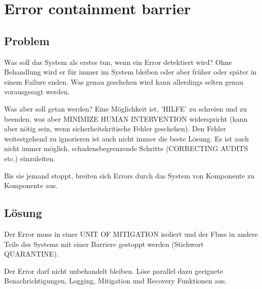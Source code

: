 \section{Error containment barrier}


\subsection{Problem}


Was soll das System als erstes tun, wenn ein Error detektiert wird? Ohne Behandlung wird er für immer im System bleiben oder aber früher oder später in einem Failure enden. Was genau geschehen wird kann allerdings selten genau vorausgesagt werden.

Was aber soll getan werden? Eine Möglichkeit ist, 'HILFE' zu schreien und zu beenden, was aber MINIMIZE HUMAN INTERVENTION widerspricht (kann aber nötig sein, wenn sicherheitskritische Fehler geschehen). Den Fehler weitestgehend zu ignorieren ist auch nicht immer die beste Lösung. Es ist auch nicht immer möglich, schadensbegrenzende Schritte (CORRECTING AUDITS etc.) einzuleiten.

Bis sie jemand stoppt, breiten sich Errors durch das System von Komponente zu Komponente aus.

\subsection{Lösung}

Der Error muss in einer UNIT OF MITIGATION isoliert und der Fluss in andere Teile des Systems mit einer Barriere gestoppt werden (Stichwort QUARANTINE).

Der Error darf nicht unbehandelt bleiben. Löse parallel dazu geeignete Benachrichtigungen, Logging, Mitigation und Recovery Funktionen aus.
